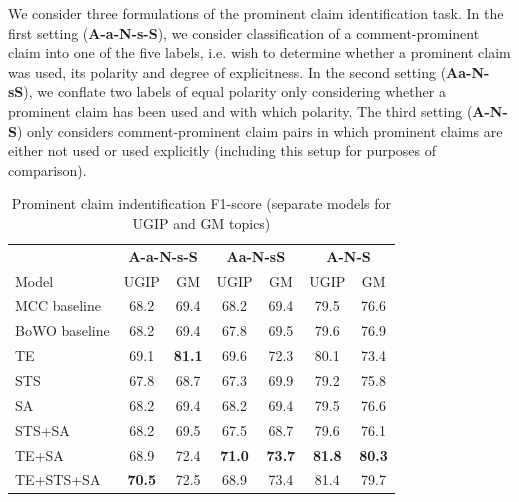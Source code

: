 We consider three formulations of the prominent claim identification task. 
In the first setting (\textbf{A-a-N-s-S}), we consider classification of a comment-prominent claim
into one of the five labels, i.e. wish to determine whether a prominent claim was used, 
its polarity and degree of explicitness. 
In the second setting (\textbf{Aa-N-sS}), we conflate two labels of equal polarity only considering
whether a prominent claim has been used and with which polarity. 
The third setting (\textbf{A-N-S}) only considers comment-prominent claim pairs
in which prominent claims are either not used or used explicitly (including
this setup for purposes of comparison). 

\begin{table}
\centering
{\small
\begin{tabular}{@{}l cc cc cc @{}}
\toprule
& 
\multicolumn{2}{c}{\textbf{A-a-N-s-S}} &
\multicolumn{2}{c}{\textbf{Aa-N-sS}} &
\multicolumn{2}{c}{\textbf{A-N-S}} \\
\cmidrule(lr){2-3}
\cmidrule(lr){4-5}
\cmidrule(lr){6-7}
Model & UGIP & GM & UGIP & GM & UGIP & GM \\ 
\midrule
MCC baseline  & 68.2 & 69.4 & 68.2 & 69.4  & 79.5 & 76.6        \\
BoWO baseline & 68.2 & 69.4 & 67.8 & 69.5 & 79.6 & 76.9        \\[1ex]
TE            & 69.1 & \textbf{81.1} & 69.6 & 72.3 & 80.1 & 73.4        \\
STS           & 67.8 & 68.7 & 67.3 & 69.9 & 79.2 & 75.8        \\
SA            & 68.2 & 69.4 & 68.2 & 69.4 & 79.5 & 76.6        \\[1ex]
STS+SA        & 68.2 & 69.5 & 67.5 & 68.7 & 79.6 & 76.1         \\
TE+SA         & 68.9 & 72.4 & \textbf{71.0} & \textbf{73.7} & \textbf{81.8} & \textbf{80.3}    \\[1ex]
TE+STS+SA   & \textbf{70.5} & 72.5 & 68.9 & 73.4 & 81.4 & 79.7        \\
\bottomrule
\end{tabular}}
\caption{Prominent claim indentification F1-score (separate models for UGIP and GM topics)}
\label{tab:claim_identification_results}
\end{table}

